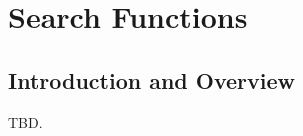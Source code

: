 \chapter{Search Functions}
\label{csea0}

\section{Introduction and Overview}
\label{csea0:siov0}

TBD.

